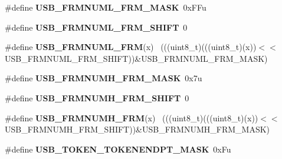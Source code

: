 \begin{DoxyCompactItemize}
\item 
\hypertarget{group___u_s_b___register___masks_ga197f6ef10431b69cb9b84fe7241a318a}{}\#define {\bfseries U\+S\+B\+\_\+\+F\+R\+M\+N\+U\+M\+L\+\_\+\+F\+R\+M\+\_\+\+M\+A\+S\+K}~0x\+F\+Fu\label{group___u_s_b___register___masks_ga197f6ef10431b69cb9b84fe7241a318a}

\item 
\hypertarget{group___u_s_b___register___masks_ga723c2de82420db0c349049ad6f66ad14}{}\#define {\bfseries U\+S\+B\+\_\+\+F\+R\+M\+N\+U\+M\+L\+\_\+\+F\+R\+M\+\_\+\+S\+H\+I\+F\+T}~0\label{group___u_s_b___register___masks_ga723c2de82420db0c349049ad6f66ad14}

\item 
\hypertarget{group___u_s_b___register___masks_ga5002850109b676e53ed7862ba73b6662}{}\#define {\bfseries U\+S\+B\+\_\+\+F\+R\+M\+N\+U\+M\+L\+\_\+\+F\+R\+M}(x)                                          ~(((uint8\+\_\+t)(((uint8\+\_\+t)(x))$<$$<$U\+S\+B\+\_\+\+F\+R\+M\+N\+U\+M\+L\+\_\+\+F\+R\+M\+\_\+\+S\+H\+I\+F\+T))\&U\+S\+B\+\_\+\+F\+R\+M\+N\+U\+M\+L\+\_\+\+F\+R\+M\+\_\+\+M\+A\+S\+K)\label{group___u_s_b___register___masks_ga5002850109b676e53ed7862ba73b6662}

\item 
\hypertarget{group___u_s_b___register___masks_ga436241a677d27ecae3001b228b51f536}{}\#define {\bfseries U\+S\+B\+\_\+\+F\+R\+M\+N\+U\+M\+H\+\_\+\+F\+R\+M\+\_\+\+M\+A\+S\+K}~0x7u\label{group___u_s_b___register___masks_ga436241a677d27ecae3001b228b51f536}

\item 
\hypertarget{group___u_s_b___register___masks_gacb18c63687d37e245a79d7e7551823a3}{}\#define {\bfseries U\+S\+B\+\_\+\+F\+R\+M\+N\+U\+M\+H\+\_\+\+F\+R\+M\+\_\+\+S\+H\+I\+F\+T}~0\label{group___u_s_b___register___masks_gacb18c63687d37e245a79d7e7551823a3}

\item 
\hypertarget{group___u_s_b___register___masks_ga34958377bceb661237ecc7ff5309def7}{}\#define {\bfseries U\+S\+B\+\_\+\+F\+R\+M\+N\+U\+M\+H\+\_\+\+F\+R\+M}(x)                                          ~(((uint8\+\_\+t)(((uint8\+\_\+t)(x))$<$$<$U\+S\+B\+\_\+\+F\+R\+M\+N\+U\+M\+H\+\_\+\+F\+R\+M\+\_\+\+S\+H\+I\+F\+T))\&U\+S\+B\+\_\+\+F\+R\+M\+N\+U\+M\+H\+\_\+\+F\+R\+M\+\_\+\+M\+A\+S\+K)\label{group___u_s_b___register___masks_ga34958377bceb661237ecc7ff5309def7}

\item 
\hypertarget{group___u_s_b___register___masks_gaa0d3bc1d6ff63ebbccad8b898e39cc84}{}\#define {\bfseries U\+S\+B\+\_\+\+T\+O\+K\+E\+N\+\_\+\+T\+O\+K\+E\+N\+E\+N\+D\+P\+T\+\_\+\+M\+A\+S\+K}~0x\+Fu\label{group___u_s_b___register___masks_gaa0d3bc1d6ff63ebbccad8b898e39cc84}


\end{DoxyCompactItemize}
